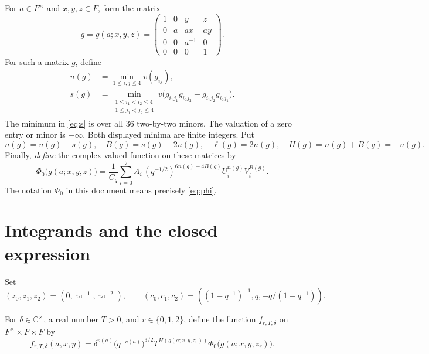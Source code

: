 \documentclass[11pt,a4paper]{article}
\newcommand{\C}{\mathbb C}
\newcommand{\Ph}{\Phi_0}
\begin{document}
For $a\in F^\times$ and $x,y,z\in F$, form the matrix
\begin{equation}\label{eq:matrix}
g= g(a;x,y,z)=
 \begin{pmatrix}
 1&0&y&z\\
 0&a&ax&ay\\
 0&0&a^{-1}&0\\
 0&0&0&1
 \end{pmatrix}.
\end{equation}
For such a matrix $g$, define
\begin{align}
 u(g)&=\min_{1\le i,j\le4}v(g_{ij}),\label{eq:u}\\
 s(g)&=\min_{\substack{1\le i_1<i_2\le4\\1\le j_1<j_2\le4}}
 v\bigl(g_{i_1j_1}g_{i_2j_2}-g_{i_1j_2}g_{i_2j_1}\bigr).\label{eq:s}
\end{align}
The minimum in \eqref{eq:s} is over all $36$ two-by-two minors. The valuation
of a zero entry or minor is $+\infty$.
Both displayed minima are finite integers. Put
\begin{equation}\label{eq:indices}
 n(g)=u(g)-s(g),\quad B(g)=s(g)-2u(g),\quad
 \ell(g)=2n(g),\quad H(g)=n(g)+B(g)=-u(g).
\end{equation}
Finally, \emph{define} the complex-valued function on these matrices by
\begin{equation}\label{eq:phi}
 \boxed{\displaystyle
 \Ph\bigl(g(a;x,y,z)\bigr)
 =\frac1{C_q}\sum_{i=0}^{7} A_i\,
 (q^{-1/2})^{6n(g)+4B(g)}U_i^{n(g)}V_i^{B(g)}.}
\end{equation}
The notation $\Ph$ in this document means precisely \eqref{eq:phi}.

\clearpage
\section{Integrands and the closed expression}

Set
\begin{equation}\label{eq:central}
 (z_0,z_1,z_2)=(0,\varpi^{-1},\varpi^{-2}),\qquad
 (c_0,c_1,c_2)=((1-q^{-1})^{-1},q,-q/(1-q^{-1})).
\end{equation}


For $\delta\in\C^\times$, a real number $T>0$, and $r\in\{0,1,2\}$, define the function $ f_{r,T,\delta}$ on $F^\times \times F \times F$ by
\begin{equation}\label{eq:integrand}
 f_{r,T,\delta}(a,x,y)
 =\delta^{v(a)}\bigl(q^{-v(a)}\bigr)^{3/2}
 T^{H(g(a;x,y,z_r))}\Ph\bigl(g(a;x,y,z_r)\bigr).
\end{equation}
\end{document}
